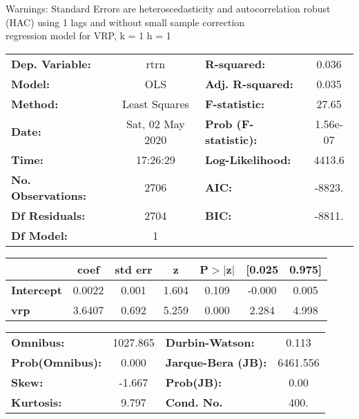 Warnings: \newline
 [1] Standard Errors are heteroscedasticity and autocorrelation robust (HAC) using 1 lags and without small sample correction\\ 

regression model for VRP, k = 1 h = 1\begin{center}
\begin{tabular}{lclc}
\toprule
\textbf{Dep. Variable:}    &       rtrn       & \textbf{  R-squared:         } &     0.036   \\
\textbf{Model:}            &       OLS        & \textbf{  Adj. R-squared:    } &     0.035   \\
\textbf{Method:}           &  Least Squares   & \textbf{  F-statistic:       } &     27.65   \\
\textbf{Date:}             & Sat, 02 May 2020 & \textbf{  Prob (F-statistic):} &  1.56e-07   \\
\textbf{Time:}             &     17:26:29     & \textbf{  Log-Likelihood:    } &    4413.6   \\
\textbf{No. Observations:} &        2706      & \textbf{  AIC:               } &    -8823.   \\
\textbf{Df Residuals:}     &        2704      & \textbf{  BIC:               } &    -8811.   \\
\textbf{Df Model:}         &           1      & \textbf{                     } &             \\
\bottomrule
\end{tabular}
\begin{tabular}{lcccccc}
                   & \textbf{coef} & \textbf{std err} & \textbf{z} & \textbf{P$> |$z$|$} & \textbf{[0.025} & \textbf{0.975]}  \\
\midrule
\textbf{Intercept} &       0.0022  &        0.001     &     1.604  &         0.109        &       -0.000    &        0.005     \\
\textbf{vrp}       &       3.6407  &        0.692     &     5.259  &         0.000        &        2.284    &        4.998     \\
\bottomrule
\end{tabular}
\begin{tabular}{lclc}
\textbf{Omnibus:}       & 1027.865 & \textbf{  Durbin-Watson:     } &    0.113  \\
\textbf{Prob(Omnibus):} &   0.000  & \textbf{  Jarque-Bera (JB):  } & 6461.556  \\
\textbf{Skew:}          &  -1.667  & \textbf{  Prob(JB):          } &     0.00  \\
\textbf{Kurtosis:}      &   9.797  & \textbf{  Cond. No.          } &     400.  \\
\bottomrule
\end{tabular}
\end{center}

